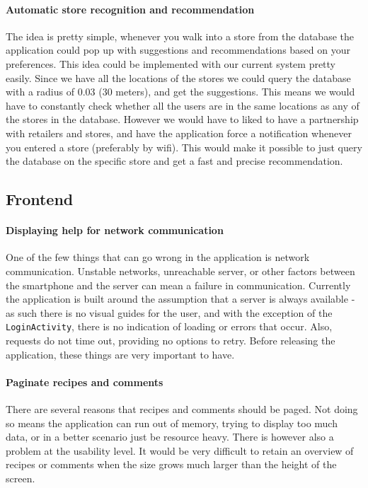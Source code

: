 \paragraph{Automatic store recognition and recommendation}
The idea is pretty simple, whenever you walk into a store from the database the application could pop up with suggestions and recommendations based on your preferences. This idea could be implemented with our current system pretty easily. Since we have all the locations of the stores we could query the database with a radius of 0.03 (30 meters), and get the suggestions. This means we would have to constantly check whether all the users are in the same locations as any of the stores in the database. However we would have to liked to have a partnership with retailers and stores, and have the application force a notification whenever you entered a store (preferably by wifi). This would make it possible to just query the database on the specific store and get a fast and precise recommendation.

\subsection{Frontend}

\paragraph{Displaying help for network communication}
One of the few things that can go wrong in the application is network communication. Unstable networks, unreachable server, or other factors between the smartphone and the server can mean a failure in communication. Currently the application is built around the assumption that a server is always available - as such there is no visual guides for the user, and with the exception of the \texttt{LoginActivity}, there is no indication of loading or errors that occur. Also, requests do not time out, providing no options to retry. Before releasing the application, these things are very important to have.

\paragraph{Paginate recipes and comments}
There are several reasons that recipes and comments should be paged. Not doing so means the application can run out of memory, trying to display too much data, or in a better scenario just be resource heavy. There is however also a problem at the usability level. It would be very difficult to retain an overview of recipes or comments when the size grows much larger than the height of the screen. 

